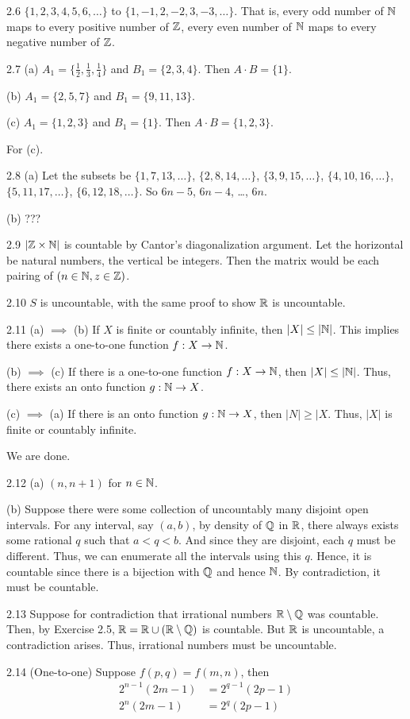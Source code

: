 2.6 $\{1,2,3,4,5,6,\dots\}$ to $\{1,-1,2,-2,3,-3,\dots\}$. That is, every odd number of $\mathbb{N}$ maps to every positive number of $\mathbb{Z}$, every even number of $\mathbb{N}$ maps to every negative number of $\mathbb{Z}$.

2.7 (a) $A_1=\{\frac{1}{2},\frac{1}{3},\frac{1}{4}\}$ and $B_1=\{2,3,4\}$. Then $A \cdot B = \{1\}$.

(b) $A_1=\{2,5,7\}$ and $B_1=\{9,11,13\}$.

(c) $A_1=\{1,2,3\}$ and $B_1=\{1\}$. Then $A\cdot B=\{1,2,3\}$.

For (c).

2.8 (a) Let the subsets be $\{1,7,13,\dots\}$, $\{2,8,14,\dots\}$, $\{3,9,15,\dots\}$, $\{4,10,16,\dots\}$, $\{5,11,17,\dots\}$, $\{6,12,18,\dots\}$. So $6n-5$, $6n-4$, \dots, $6n$.

(b) ???

2.9 $|\mathbb{Z} \times \mathbb{N}|$ is countable by Cantor's diagonalization argument. Let the horizontal be natural numbers, the vertical be integers.
Then the matrix would be each pairing of $(n \in \mathbb{N}, z \in \mathbb{Z})$.

2.10 $S$ is uncountable, with the same proof to show $\mathbb{R}$ is uncountable.

2.11 (a) $\implies$ (b) If $X$ is finite or countably infinite, then $|X| \leq |\mathbb{N}|$. This implies there exists a one-to-one function $f:X \rightarrow \mathbb{N}$.

(b) $\implies$ (c) If there is a one-to-one function $f:X \rightarrow \mathbb{N}$, then $|X| \leq |\mathbb{N}|$. Thus, there exists an onto function $g: \mathbb{N} \rightarrow X$.

(c) $\implies$ (a) If there is an onto function $g:\mathbb{N} \rightarrow X$, then $|N| \geq |X$. Thus, $|X|$ is finite or countably infinite.

We are done.

2.12 (a) $(n,n+1)$ for $n \in \mathbb{N}$.

(b) Suppose there were some collection of uncountably many disjoint open intervals. For any interval, say $(a,b)$, by density of $\mathbb{Q}$ in $\mathbb{R}$,
there always exists some rational $q$ such that $a < q < b$. And since they are disjoint, each $q$ must be different. Thus, we can enumerate
all the intervals using this $q$. Hence, it is countable since there is a bijection with $\mathbb{Q}$ and hence $\mathbb{N}$. By contradiction, it must be countable.

2.13 Suppose for contradiction that irrational numbers $\mathbb{R} \setminus \mathbb{Q}$ was countable. Then, by Exercise 2.5, $\mathbb{R} = \mathbb{R} \cup (\mathbb{R} \setminus \mathbb{Q})$ is countable. But
$\mathbb{R}$ is uncountable, a contradiction arises. Thus, irrational numbers must be uncountable.

2.14 (One-to-one) Suppose $f(p,q)=f(m,n)$, then
\begin{align}
    2^{n-1}(2m-1) &= 2^{q-1}(2p-1) \\
    2^n(2m-1) &= 2^q(2p-1)
\end{align}